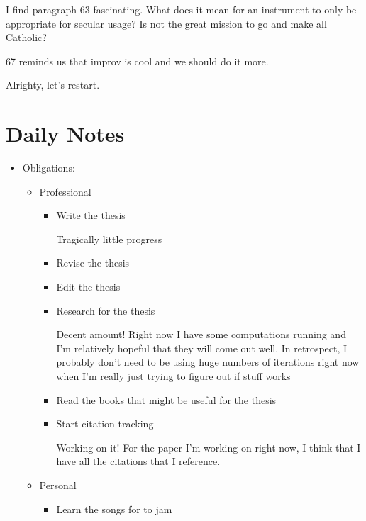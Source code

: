 \documentclass[12pt]{article}
\renewcommand{\,}{\textsuperscript{,}}
\begin{document}
I find paragraph 63 fascinating.  
What does it mean for an instrument to only be appropriate for secular usage?  
Is not the great mission to go and make all Catholic?

67 reminds us that improv is cool and we should do it more.

Alrighty, let's restart.

\section{Daily Notes}

\begin{itemize}

\item Obligations:

\begin{itemize}

\item Professional

\begin{itemize}

\item Write the thesis

Tragically little progress

\item Revise the thesis

\item Edit the thesis

\item Research for the thesis

Decent amount! Right now I have some computations running and I'm relatively hopeful that they will come out well.  
In retrospect, I probably don't need to be using huge numbers of iterations right now when I'm really just trying to figure out if stuff works

\item Read the books that might be useful for the thesis

\item Start citation tracking

Working on it! For the paper I'm working on right now, I think that I have all the citations that I reference.

\end{itemize}

\item Personal

\begin{itemize}

\item Learn the songs for to jam


\end{itemize}
\end{itemize}
\end{itemize}
\end{document}
